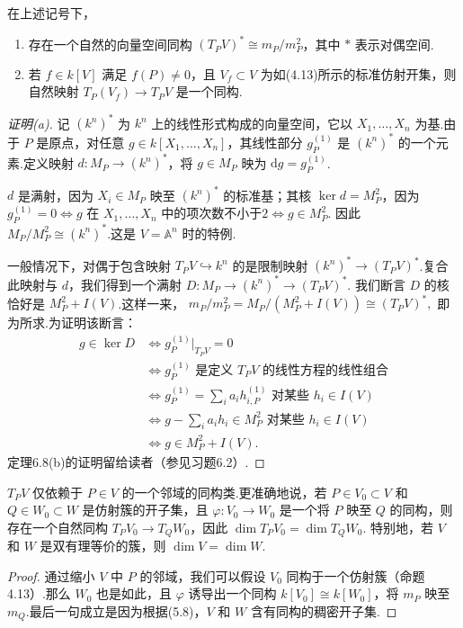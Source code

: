 \begin{theorem}
在上述记号下，
\begin{enumerate}
    \item[\upshape (a)] 存在一个自然的向量空间同构 \( (T_P V)^* \cong m_P/m_P^2 \)，其中 \(*\) 表示对偶空间.
    \item[\upshape (b)] 若 \(f \in k[V]\) 满足 \(f(P) \neq 0\)，且 \(V_f \subset V\) 为如(4.13)所示的标准仿射开集，则自然映射 \(T_P(V_f) \to T_P V\) 是一个同构.
\end{enumerate}
\end{theorem}
\begin{proof}[证明(a)]
记 \((k^n)^*\) 为 \(k^n\) 上的线性形式构成的向量空间，它以 \(X_1, \ldots, X_n\) 为基.由于 \(P\) 是原点，对任意 \(g \in k[X_1, \ldots, X_n]\)，其线性部分 \(g_P^{(1)}\) 是 \((k^n)^*\) 的一个元素.定义映射 \(d: M_P \to (k^n)^*\)，将 \(g \in M_P\) 映为 \(\mathrm{d}g = g_P^{(1)}\).

\(d\) 是满射，因为 \(X_i \in M_P\) 映至 \((k^n)^*\) 的标准基；其核 \(\ker d = M_P^2\)，因为
\(
g_P^{(1)} = 0 \iff g \text{ 在 } X_1, \ldots, X_n \text{ 中的项次数不小于2} \iff g \in M_P^2.
\)
因此 \(M_P/M_P^2 \cong (k^n)^*\).这是 \(V = \mathbb{A}^n\) 时的特例.

一般情况下，对偶于包含映射 \(T_P V \hookrightarrow k^n\) 的是限制映射 \((k^n)^* \to (T_P V)^*\).复合此映射与 \(d\)，我们得到一个满射
\(
D: M_P \to (k^n)^* \to (T_P V)^*.
\)
我们断言 \(D\) 的核恰好是 \(M_P^2 + I(V)\).这样一来，
\(
m_P/m_P^2 = M_P/(M_P^2 + I(V)) \cong (T_P V)^*,
\)
即为所求.为证明该断言：
\begin{align*}
g \in \ker D &\iff g_P^{(1)}|_{T_P V} = 0 \\
&\iff g_P^{(1)} \text{ 是定义 } T_P V \text{ 的线性方程的线性组合} \\
&\iff g_P^{(1)} = \sum_i a_i h_{i,P}^{(1)} \text{ 对某些 } h_i \in I(V) \\
&\iff g - \sum_i a_i h_i \in M_P^2 \text{ 对某些 } h_i \in I(V) \\
&\iff g \in M_P^2 + I(V).
\end{align*}
定理6.8(b)的证明留给读者（参见习题6.2）.
\end{proof}

\begin{corollary}
\(T_P V\) 仅依赖于 \(P \in V\) 的一个邻域的同构类.更准确地说，若 \(P \in V_0 \subset V\) 和 \(Q \in W_0 \subset W\) 是仿射簇的开子集，且 \(\varphi: V_0 \to W_0\) 是一个将 \(P\) 映至 \(Q\) 的同构，则存在一个自然同构 \(T_P V_0 \to T_Q W_0\)，因此 \(\dim T_P V_0 = \dim T_Q W_0\).
特别地，若 \(V\) 和 \(W\) 是双有理等价的簇，则 \(\dim V = \dim W\).
\end{corollary}
\begin{proof}
通过缩小 \(V\) 中 \(P\) 的邻域，我们可以假设 \(V_0\) 同构于一个仿射簇（命题4.13）.那么 \(W_0\) 也是如此，且 \(\varphi\) 诱导出一个同构 \(k[V_0] \cong k[W_0]\)，将 \(m_P\) 映至 \(m_Q\).最后一句成立是因为根据(5.8)，\(V\) 和 \(W\) 含有同构的稠密开子集.
\end{proof}

